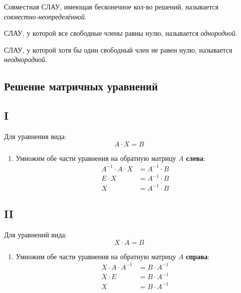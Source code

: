\begin{definition}
  Совместная СЛАУ, имеющая бесконечное кол-во решений, называется \textit{совместно-неопределённой}.
\end{definition}

\begin{definition}
  СЛАУ, у которой все свободные члены равны нулю, называется \textit{однородной}.
\end{definition}

\begin{definition}
  СЛАУ, у которой хотя бы один свободный член не равен нулю, называется \textit{неоднородной}.
\end{definition}

\subsection{Решение матричных уравнений}

\subsection*{I}

Для уравнения вида: \[
A \cdot X = B
\] 
\begin{enumerate}
  \item Умножим обе части уравнения на обратную матрицу $A$ \textbf{слева}:
    \begin{align*}
      A^{-1} \cdot A \cdot X &= A^{-1} \cdot B \\
      E \cdot X &= A^{-1} \cdot B \\
      X &= A^{-1} \cdot  B
    \end{align*}
\end{enumerate}

\subsection*{II}

Для уравнений вида: \[
X \cdot A = B
\] 
\begin{enumerate}
  \item Умножим обе части уравнения на обратную матрицу $A$ \textbf{справа}:
    \begin{align*}
      X \cdot A \cdot A^{-1} &= B \cdot A^{-1} \\
      X \cdot E &= B \cdot A^{-1} \\
      X &= B \cdot A^{-1} \\
    \end{align*}
\end{enumerate}

